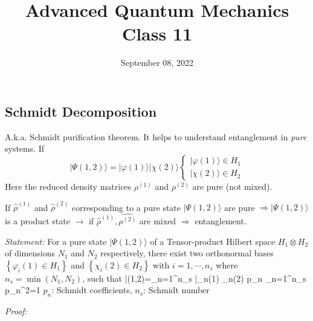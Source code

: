 \documentclass[12pt]{article}
\title{Advanced Quantum Mechanics\\Class 11}
\date{September 08, 2022}                                           %
\begin{document}
\maketitle

\subsection{Schmidt Decomposition}

A.k.a. Schmidt purification theorem.
It helps to understand entanglement in \emph{pure} systems.
If
\[
|\Psi(1,2)\rangle=|\varphi(1)\rangle|\chi(2)\rangle\left\{\begin{array}{l}|\varphi(1)\rangle \in H_{1} \\ |\chi(2)\rangle \in H_{2}\end{array}\right.
\]
Here the reduced density matrices \(\rho^{(1)}\) and \(\rho^{(2)}\)
are pure (not mixed).

If \(\hat{\rho}^{(1)}\) and \(\hat{\rho}^{(2)}\) corresponding to a pure state
\(|\Psi(1,2)\rangle\) are pure \(\Rightarrow|\Psi(1,2)\rangle\) is a product state
\(\rightarrow\) if \(\hat{\rho}^{(1)}, \hat{\rho^{(2)}}\) are mixed \(\Rightarrow\) entanglement.

\emph{Statement:} For a pure state \(|\Psi(1,2)\rangle\) of a
Tensor-product Hilbert space \(H_{1}\otimes H_{2}\)
of dimensions \(N_{1}\) and \(N_{2}\) respectively,
there exist two orthonormal bases
\(\left\{\varphi_{i}(1) \in H_{1}\right\}\) and 
\(\left\{\chi_{i}(2) \in H_{2}\right\}\) with \(i=1, \cdots, n_{s}\)
where \(n_{s}=\min\left(N_{1}, N_{2}\right)\), such that
\be
|\Psi(1,2)\rangle=\sum_{n=1}^{n_{s}} \left|\varphi_{n}(1) \otimes \chi_{n}(2)\right\rangle
\label{eq:g128}
\ee
{} \leqslant p_{n}  \sum_{n=1}^{n_{s}} p_{n}^{2}=1
\label{eq:g129}
\ee
$p_{n}$: Schmidt coefficients, \(n_{s}\): Schmidt number


\emph{Proof:}
\end{document}
